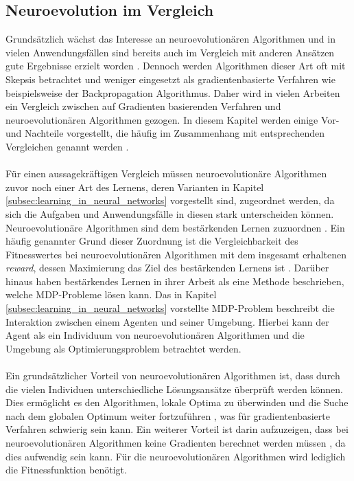 \subsection{Neuroevolution im Vergleich}
\label{subsec:comparision_neuroevoltion}
Grundsätzlich wächst das Interesse an neuroevolutionären Algorithmen und in vielen Anwendungsfällen sind bereits auch im Vergleich mit anderen Ansätzen gute Ergebnisse erzielt worden \cite{meisner2009neurostrategies}. Dennoch werden Algorithmen dieser Art oft mit Skepsis betrachtet und weniger eingesetzt als gradientenbasierte Verfahren wie beispielsweise der Backpropagation Algorithmus. Daher wird in vielen Arbeiten ein Vergleich zwischen auf Gradienten basierenden Verfahren und neuroevolutionären Algorithmen gezogen. In diesem Kapitel werden einige Vor- und Nachteile vorgestellt, die häufig im Zusammenhang mit entsprechenden Vergleichen genannt werden \cite{rojas1996neural, meisner2009neurostrategies, such2017deep, whitley1993genetic}.
\\\\
Für einen aussagekräftigen Vergleich müssen neuroevolutionäre Algorithmen zuvor noch einer Art des Lernens, deren Varianten in Kapitel \ref{subsec:learning_in_neural_networks} vorgestellt sind, zugeordnet werden, da sich die Aufgaben und Anwendungsfälle in diesen stark unterscheiden können. Neuroevolutionäre Algorithmen sind dem bestärkenden Lernen zuzuordnen \cite{whitley1993genetic}. Ein häufig genannter Grund dieser Zuordnung ist die Vergleichbarkeit des Fitnesswertes bei neuroevolutionären Algorithmen mit dem insgesamt erhaltenen \emph{reward}, dessen Maximierung das Ziel des bestärkenden Lernens ist \cite{such2017deep}. Darüber hinaus haben \citeauthor{sutton2018reinforcement} bestärkendes Lernen in ihrer Arbeit als eine Methode beschrieben, welche \ac{MDP}-Probleme lösen kann. Das in Kapitel \ref{subsec:learning_in_neural_networks} vorstellte \ac{MDP}-Problem beschreibt die Interaktion zwischen einem Agenten und seiner Umgebung. Hierbei kann der Agent als ein Individuum von neuroevolutionären Algorithmen und die Umgebung als Optimierungsproblem betrachtet werden. 
\\\\
Ein grundsätzlicher Vorteil von neuroevolutionären Algorithmen ist, dass durch die vielen Individuen unterschiedliche Lösungsansätze überprüft werden können. Dies ermöglicht es den Algorithmen, lokale Optima zu überwinden und die Suche nach dem globalen Optimum weiter fortzuführen \cite{rojas1996neural}, was für gradientenbasierte Verfahren schwierig sein kann. Ein weiterer Vorteil ist darin aufzuzeigen, dass bei neuroevolutionären Algorithmen keine Gradienten berechnet werden müssen \cite{rojas1996neural}, da dies aufwendig sein kann. Für die neuroevolutionären Algorithmen wird lediglich die Fitnessfunktion benötigt. 
